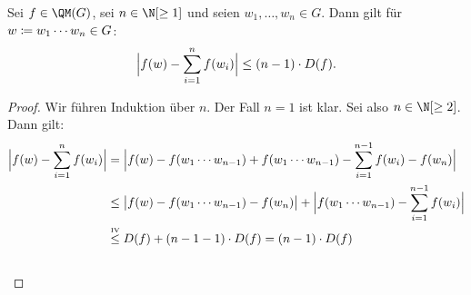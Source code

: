 \begin{thLemma} \label{homo:qmprod}
    Sei $f\in\QM(G)$, sei $n\in\N[\geq1]$ und seien
    $w_1,\dots,w_n\in G$. Dann gilt für $w\defeq w_1\cdots w_n\in G$:
    \[ \abs[\Big]{ f(w) - \isum^n f(w_i) } \leq (n-1)\cdot D(f)  . \]
\end{thLemma}

\begin{proof}
   Wir führen Induktion über $n$. Der Fall $n=1$ ist klar. Sei also
   $n\in\N[\geq2]$. Dann gilt:
   \begin{align*}
       \abs[\Big]{ f(w) - \isum^n f(w_i) }
       &= \abs[\Big]{
           f(w) - f(w_1\cdots w_{n-1}) + f(w_1\cdots w_{n-1})
           - \isum^{n-1} f(w_i) - f(w_n)
          }
       \\
       &\leq
       \abs[\big]{f(w) - f(w_1\cdots w_{n-1}) - f(w_n)}
       + \abs[\Big]{f(w_1\cdots w_{n-1}) - \isum^{n-1} f(w_i)}
       \\
       &\overset{\text{\clap{\tiny IV}}}\leq
           D(f) + (n-1-1) \cdot D(f)
        = (n-1) \cdot D(f)
        \\
        &\qedhere
   \end{align*}
\end{proof}

